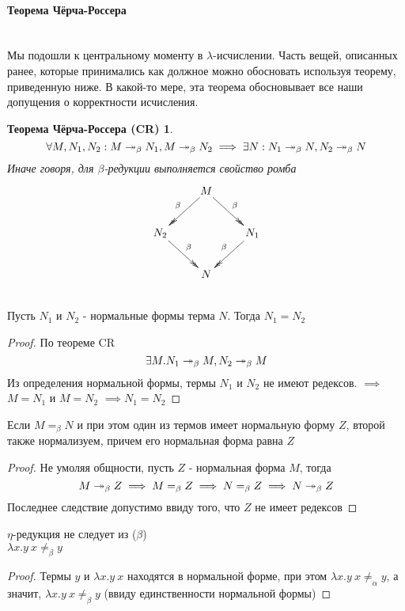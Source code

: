 \documentclass[lambda.tex]{subfiles}
\begin{document}
\begin{tcolorbox}
	\paragraph{Теорема Чёрча-Россера} %
	\label{par:Church-Rosser}~\\
	Мы подошли к центральному моменту в $\lambda$-исчислении. Часть вещей, описанных ранее, которые принимались как должное можно обосновать используя теорему, приведенную ниже. В какой-то мере, эта теорема обосновывает все наши допущения о корректности исчисления.
	\newtheorem*{churchrosser}{Теорема Чёрча-Россера (CR)}
	\begin{churchrosser}
		$$
		\forall M,N_1,N_2:M
		\twoheadrightarrow_\beta N_1, M
		\twoheadrightarrow_\beta N_2
		\implies
		\exists N : N_1
		\twoheadrightarrow_\beta N,N_2
		\twoheadrightarrow_\beta N
		$$
		Иначе говоря, для $\beta$-редукции выполняется свойство ромба
		\begin{align*}
			\xymatrix{
			& \ar@{->>}[dl]_\beta M \ar@{->>}[dr]^\beta \\
			N_2 \ar@{->>}[dr]^\beta & & N_1 \ar@{->>}[dl]_\beta \\
			&N
		}
		\end{align*}
	\end{churchrosser}


	\begin{corollary}
		~\\
		Пусть $N_1$ и $N_2$ - нормальные формы терма $N$. Тогда $N_1 = N_2$ 
	\end{corollary}
	\begin{proof}
		По теореме CR $$\exists M.N_1 \twoheadrightarrow_\beta M, N_2 \twoheadrightarrow_\beta M$$
		Из определения нормальной формы, термы $N_1$ и $N_2$ не имеют редексов.
		$\implies$ $M=N_1$ и $M=N_2$ $\implies N_1 = N_2$
	\end{proof}
	\begin{corollary}
		Если $M =_\beta N$ и при этом один из термов имеет нормальную форму $Z$, второй также нормализуем, причем его нормальная форма равна $Z$
	\end{corollary}
	\begin{proof}
		Не умоляя общности, пусть $Z$ - нормальная форма $M$, тогда 
		$$M \twoheadrightarrow_\beta Z \implies M =_\beta Z \implies N =_\beta Z \implies N \twoheadrightarrow_\beta Z$$
		Последнее следствие допустимо ввиду того, что $Z$ не имеет редексов
	\end{proof}
	\begin{corollary}
		$\eta$-редукция не следует из ($\beta$)
		~\\
		$\lambda x.y\ x \neq_\beta y$
	\end{corollary}
	\begin{proof}
		Термы $y$ и $\lambda x.y\ x$ находятся в нормальной форме, при этом $\lambda x.y\ x \neq_\alpha y$, а значит, $\lambda x.y\ x \neq_\beta y$ (ввиду единственности нормальной формы)
	\end{proof}
\end{tcolorbox}
\end{document}
